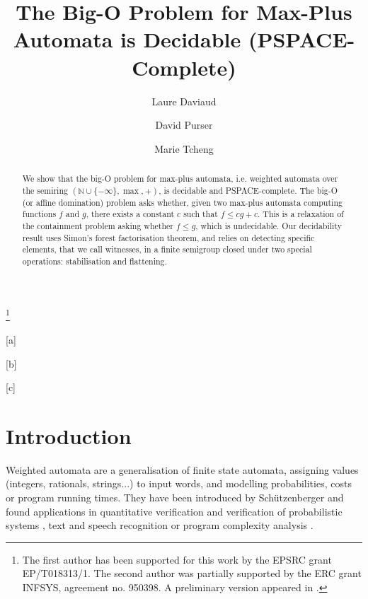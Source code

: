 \documentclass{lmcs}
\theoremstyle{remark}
\theoremstyle{remark}
\begin{document}
\title{The Big-O Problem for Max-Plus Automata is Decidable (PSPACE-Complete)}
\thanks{The first author has been supported for this work by the
EPSRC grant EP/T018313/1. The second author was partially supported by the ERC grant INFSYS, agreement no. 950398.
A preliminary version appeared in \cite{DaviaudP23}. 
}

\author[L.~Daviaud]{Laure Daviaud}[a]
\author[D.~Purser]{David Purser}[b]
\author[M.~Tcheng]{Marie Tcheng}[c]


\address{University of East Anglia, UK}

\address{University of Liverpool, UK}

\address{ENS Paris Saclay, France}

\begin{abstract}
We show that the big-O problem for max-plus automata, i.e. weighted automata over the semiring  $(\mathbb{N}\cup \{-\infty\}, \max, +)$, is decidable and PSPACE-complete. The big-O (or affine domination) problem asks whether, given two max-plus automata computing functions $f$ and $g$,  there exists a constant $c$ such that $f \leq cg+ c$. This is a relaxation of the containment problem asking whether $f \le g$, which is undecidable. 
Our decidability result uses Simon's forest factorisation theorem, and relies on detecting specific elements, that we call witnesses, in a finite semigroup closed under two special operations: stabilisation and flattening.
\end{abstract}

\maketitle

\section{Introduction}

Weighted automata are a generalisation of finite state automata, assigning values (integers, rationals, strings...) to input words, and modelling probabilities, costs or program running times. They have been introduced by Sch\"utzenberger \cite{Schutzenberger61b} and found applications in quantitative verification \cite{ChatterjeeDH10} and verification of probabilistic systems \cite{Vardi85}, text and speech recognition \cite{MohriPR02} or program complexity analysis  \cite{ColcombetDZ14}. 
\end{document}
